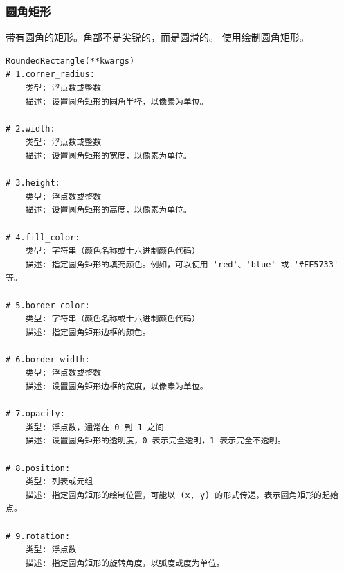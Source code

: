 \subsubsection{圆角矩形}
带有圆角的矩形。角部不是尖锐的，而是圆滑的。
使用绘制圆角矩形。

\begin{lstlisting}[style=demostyle,numbers=none]
RoundedRectangle(**kwargs)
# 1.corner_radius:
    类型: 浮点数或整数
    描述: 设置圆角矩形的圆角半径，以像素为单位。

# 2.width:
    类型: 浮点数或整数
    描述: 设置圆角矩形的宽度，以像素为单位。

# 3.height:
    类型: 浮点数或整数
    描述: 设置圆角矩形的高度，以像素为单位。
    
# 4.fill_color:
    类型: 字符串（颜色名称或十六进制颜色代码）
    描述: 指定圆角矩形的填充颜色。例如，可以使用 'red'、'blue' 或 '#FF5733' 等。
    
# 5.border_color:
    类型: 字符串（颜色名称或十六进制颜色代码）
    描述: 指定圆角矩形边框的颜色。
    
# 6.border_width:
    类型: 浮点数或整数
    描述: 设置圆角矩形边框的宽度，以像素为单位。

# 7.opacity:
    类型: 浮点数，通常在 0 到 1 之间
    描述: 设置圆角矩形的透明度，0 表示完全透明，1 表示完全不透明。

# 8.position:
    类型: 列表或元组
    描述: 指定圆角矩形的绘制位置，可能以 (x, y) 的形式传递，表示圆角矩形的起始点。
    
# 9.rotation:
    类型: 浮点数
    描述: 指定圆角矩形的旋转角度，以弧度或度为单位。
\end{lstlisting}

